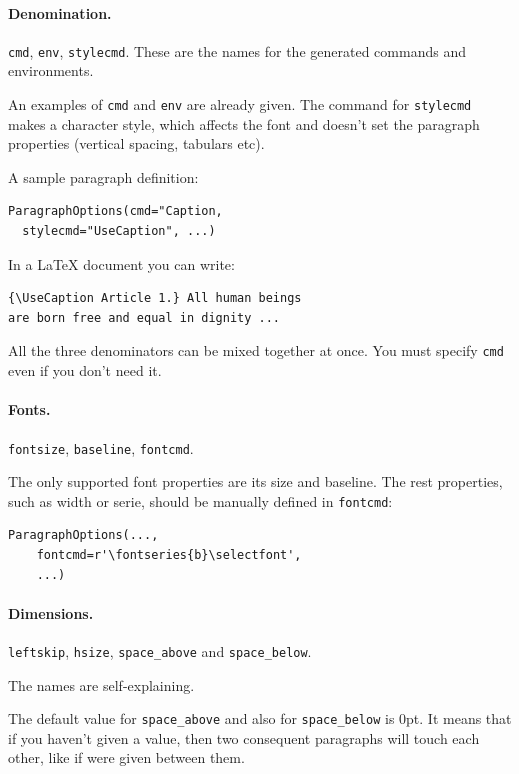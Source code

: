 \documentclass[]{ltugboat}
\begin{document}
\paragraph{Denomination.} \verb|cmd|, \verb|env|, \verb|stylecmd|. These are the names for the generated commands and environments.

An examples of \verb|cmd| and \verb|env| are already given. The command for \verb|stylecmd| makes a character style, which affects the font and doesn't set the paragraph properties (vertical spacing, tabulars etc).

A sample paragraph definition:

\begin{verbatim}
ParagraphOptions(cmd="Caption,
  stylecmd="UseCaption", ...)
\end{verbatim}

In a \LaTeX{} document you can write:

\begin{verbatim}
{\UseCaption Article 1.} All human beings
are born free and equal in dignity ...
\end{verbatim}

All the three denominators can be mixed together at once. You must specify \verb|cmd| even if you don't need it.

\paragraph{Fonts.} \verb|fontsize|, \verb|baseline|, \verb|fontcmd|.

The only supported font properties are its size and baseline. The rest properties, such as width or serie, should be manually defined in \verb|fontcmd|:

\begin{verbatim}
ParagraphOptions(...,
    fontcmd=r'\fontseries{b}\selectfont',
    ...)
\end{verbatim}

\paragraph{Dimensions.} \verb|leftskip|, \verb|hsize|, \verb|space_above| and \verb|space_below|.

The names are self-explaining.

The default value for \verb|space_above| and also for \verb|space_below| is 0pt. It means that if you haven't given a value, then two consequent paragraphs will touch each other, like if  were given between them.
\end{document}
